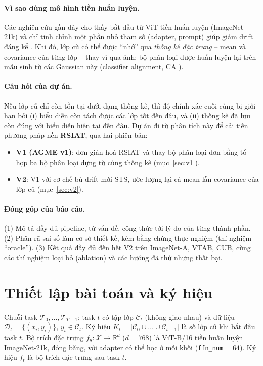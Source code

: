 \documentclass[11pt]{article}
\newcommand{\R}{\mathbb{R}}
\begin{document}
\paragraph{Vì sao dùng mô hình tiền huấn luyện.} Các nghiên cứu gần đây cho thấy bắt đầu từ ViT tiền huấn luyện
(ImageNet-21k) và chỉ tinh chỉnh một phần nhỏ tham số (adapter, prompt) giúp giảm drift đáng kể
\cite{slca,ssiat}. Khi đó, lớp cũ có thể được ``nhớ'' qua \emph{thống kê đặc trưng} -- mean và covariance của từng lớp
-- thay vì qua ảnh; bộ phân loại được huấn luyện lại trên mẫu sinh từ các Gaussian này (classifier alignment, CA
\cite{slca}).

\paragraph{Câu hỏi của dự án.} Nếu lớp cũ chỉ còn tồn tại dưới dạng thống kê, thì độ chính xác cuối cùng bị giới hạn
bởi (i) biểu diễn còn tách được các lớp tốt đến đâu, và (ii) thống kê đã lưu còn đúng với biểu diễn hiện tại đến đâu.
Dự án đi từ phân tích này để cải tiến phương pháp nền \textbf{RSIAT}, qua hai phiên bản:
\begin{itemize}
  \item \textbf{V1 (AGME v1)}: đơn giản hoá RSIAT và thay bộ phân loại đơn bằng tổ hợp ba bộ phân loại dựng từ cùng
        thống kê (mục~\ref{sec:v1}).
  \item \textbf{V2}: V1 với cơ chế bù drift mới STS, ước lượng lại cả mean lẫn covariance của lớp cũ
        (mục~\ref{sec:v2}).
\end{itemize}

\paragraph{Đóng góp của báo cáo.}
(1) Mô tả đầy đủ pipeline, từ vấn đề, công thức tới lý do của từng thành phần.
(2) Phân rã sai số làm cơ sở thiết kế, kèm bằng chứng thực nghiệm (thí nghiệm ``oracle'').
(3) Kết quả đầy đủ đến hết V2 trên ImageNet-A, VTAB, CUB, cùng các thí nghiệm loại bỏ (ablation) và các hướng đã thử
nhưng thất bại.

\section{Thiết lập bài toán và ký hiệu}\label{sec:setup}

Chuỗi task $\mathcal{T}_0,\dots,\mathcal{T}_{T-1}$; task $t$ có tập lớp $\mathcal{C}_t$ (không giao nhau) và dữ liệu
$\mathcal{D}_t=\{(x_i,y_i)\}$, $y_i\in\mathcal{C}_t$. Ký hiệu $K_t=|\mathcal{C}_0\cup\dots\cup\mathcal{C}_{t-1}|$ là
số lớp cũ khi bắt đầu task $t$. Bộ trích đặc trưng $f_\theta:\mathcal{X}\to\R^{d}$ ($d=768$) là ViT-B/16 tiền huấn
luyện ImageNet-21k, đóng băng, với adapter có thể học ở mỗi khối (\texttt{ffn\_num}$=64$). Ký hiệu $f_{t}$ là bộ trích
đặc trưng sau task $t$.
\end{document}
